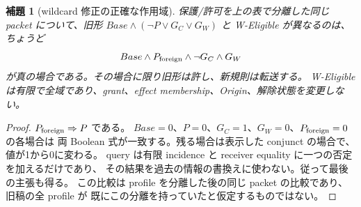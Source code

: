 \documentclass[11pt,a4paper]{article}
\newtheorem{lemma}[definition]{補題}
\begin{document}
\begin{lemma}[wildcard 修正の正確な作用域]
\label{lem:wildcard-query}
保護/許可を上の表で分離した同じ packet について、旧形
\(Base\land(\neg P\lor G_C\lor G_W)\) と W-Eligible が異なるのは、ちょうど
\[
 Base\land P_{\rm foreign}\land\neg G_C\land G_W
\]
が真の場合である。その場合に限り旧形は許し、新規則は転送する。
W-Eligible は有限で全域であり、grant、effect membership、Origin、解除状態を変更しない。
\end{lemma}
\begin{proof}
\(P_{\rm foreign}\Rightarrow P\) である。
\(Base=0\)、\(P=0\)、\(G_C=1\)、\(G_W=0\)、\(P_{\rm foreign}=0\) の各場合は
両 Boolean 式が一致する。残る場合は表示した conjunct の場合で、値が1から0に変わる。
query は有限 incidence と receiver equality に一つの否定を加えるだけであり、
その結果を過去の情報の書換えに使わない。従って最後の主張も得る。
この比較は profile を分離した後の同じ packet の比較であり、旧稿の全 profile が
既にこの分離を持っていたと仮定するものではない。
\end{proof}
\end{document}
